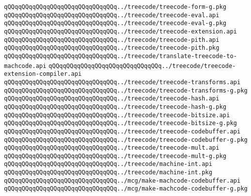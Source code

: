\verb|qQQqqQQqqQQqqQQqqQQqqQQqqQQqqQQq../treecode/treecode-form-g.pkg|\newline
\verb|qQQqqQQqqQQqqQQqqQQqqQQqqQQqqQQq../treecode/treecode-eval.api|\newline
\verb|qQQqqQQqqQQqqQQqqQQqqQQqqQQqqQQq../treecode/treecode-eval-g.pkg|\newline
\verb|qQQqqQQqqQQqqQQqqQQqqQQqqQQqqQQq../treecode/treecode-extension.api|\newline
\verb|qQQqqQQqqQQqqQQqqQQqqQQqqQQqqQQq../treecode/treecode-pith.api|\newline
\verb|qQQqqQQqqQQqqQQqqQQqqQQqqQQqqQQq../treecode/treecode-pith.pkg|\newline
\verb|qQQqqQQqqQQqqQQqqQQqqQQqqQQqqQQq../treecode/translate-treecode-to-machcode.api|\newline
\verb|qQQqqQQqqQQqqQQqqQQqqQQqqQQqqQQq../treecode/treecode-extension-compiler.api|\newline
\verb|qQQqqQQqqQQqqQQqqQQqqQQqqQQqqQQq../treecode/treecode-transforms.api|\newline
\verb|qQQqqQQqqQQqqQQqqQQqqQQqqQQqqQQq../treecode/treecode-transforms-g.pkg|\newline
\verb|qQQqqQQqqQQqqQQqqQQqqQQqqQQqqQQq../treecode/treecode-hash.api|\newline
\verb|qQQqqQQqqQQqqQQqqQQqqQQqqQQqqQQq../treecode/treecode-hash-g.pkg|\newline
\verb|qQQqqQQqqQQqqQQqqQQqqQQqqQQqqQQq../treecode/treecode-bitsize.api|\newline
\verb|qQQqqQQqqQQqqQQqqQQqqQQqqQQqqQQq../treecode/treecode-bitsize-g.pkg|\newline
\verb|qQQqqQQqqQQqqQQqqQQqqQQqqQQqqQQq../treecode/treecode-codebuffer.api|\newline
\verb|qQQqqQQqqQQqqQQqqQQqqQQqqQQqqQQq../treecode/treecode-codebuffer-g.pkg|\newline
\verb|qQQqqQQqqQQqqQQqqQQqqQQqqQQqqQQq../treecode/treecode-mult.api|\newline
\verb|qQQqqQQqqQQqqQQqqQQqqQQqqQQqqQQq../treecode/treecode-mult-g.pkg|\newline
\verb|qQQqqQQqqQQqqQQqqQQqqQQqqQQqqQQq../treecode/machine-int.api|\newline
\verb|qQQqqQQqqQQqqQQqqQQqqQQqqQQqqQQq../treecode/machine-int.pkg|\newline
\verb|qQQqqQQqqQQqqQQqqQQqqQQqqQQqqQQq../mcg/make-machcode-codebuffer.api|\newline
\verb|qQQqqQQqqQQqqQQqqQQqqQQqqQQqqQQq../mcg/make-machcode-codebuffer-g.pkg|\newline
